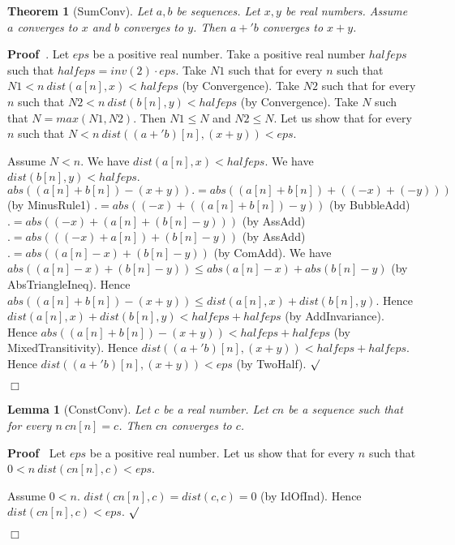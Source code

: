 \documentclass{article}
\newenvironment{forthel}{\begin{leftbar}}{\end{leftbar}}
\newenvironment{proof}{\noindent\textbf{Proof\ }}{\hspace*{\fill}$\Box$\medskip}
\newenvironment{subproof}{\begin{list}{}{}
		\item[\text{Proof}]}{\hfill $\surd$ \end{list}}
\newtheorem{lemma}{Lemma}
\newtheorem{theorem}{Theorem}
\begin{document}
\begin{forthel}
	\begin{theorem} [SumConv]
	Let $a,b$ be sequences. Let $x,y$ be real numbers. Assume $a$ converges to $x$ and $b$ converges to $y$.
	Then $a +' b$ converges to $x + y$.
	\end{theorem}
	\begin{proof}.
	Let $eps$ be a positive real number.
	Take a positive real number $halfeps$ such that $halfeps = inv(2) \cdot eps$.
	Take $N1$ such that for every $n$ such that $N1 < n \ dist(a[n],x) < halfeps$ (by Convergence).
	Take $N2$ such that for every $n$ such that $N2 < n \ dist(b[n],y) < halfeps$ (by Convergence).
	Take $N$ such that $N = max(N1,N2)$.
	Then $N1 \leq N$ and $N2 \leq N$.
	Let us show that for every $n$ such that $N < n \ dist((a +' b)[n],(x+y)) < eps$.
	\begin{subproof}
	Assume $N < n$.
	We have $dist(a[n],x) < halfeps$.
	We have $dist(b[n],y) < halfeps$.
	$abs((a[n] + b[n]) - (x + y)) .= abs((a[n] + b[n]) + ((-x) + (-y)))$ (by MinusRule1)
	$.= abs((-x) + ((a[n] + b[n]) - y))$ (by BubbleAdd)
	$.= abs((-x) + (a[n] + (b[n] - y)))$ (by AssAdd)
	$.= abs(((-x) + a[n]) + (b[n] - y))$ (by AssAdd)
	$.= abs((a[n] - x) + (b[n] - y))$ (by ComAdd).
	We have $abs((a[n] - x) + (b[n] - y)) \leq abs(a[n] - x) + abs(b[n] - y)$  (by AbsTriangleIneq).
	Hence $abs((a[n] + b[n]) - (x + y)) \leq dist(a[n],x) + dist(b[n],y)$.
	Hence $dist(a[n],x) + dist(b[n],y) < halfeps + halfeps$ (by AddInvariance).
	Hence $abs((a[n] + b[n]) - (x + y)) < halfeps + halfeps$ (by MixedTransitivity).
	Hence $dist((a +' b)[n],(x + y)) < halfeps + halfeps$.
	Hence $dist((a +' b)[n],(x + y)) < eps$ (by TwoHalf).
	\end{subproof}
	\end{proof}
	
	\begin{lemma} [ConstConv]
	Let $c$ be a real number. Let $cn$ be a sequence such that for every $n \ cn[n] = c$.
	Then $cn$ converges to $c$.
	\end{lemma}
	\begin{proof}
	Let $eps$ be a positive real number.
	Let us show that for every $n$ such that $0 < n \ dist(cn[n],c) < eps$.
	\begin{subproof}
	Assume $0 < n$.
	$dist(cn[n],c) = dist(c,c) = 0$ (by IdOfInd).
	Hence $dist(cn[n],c) < eps$.
	\end{subproof}
	\end{proof}
	

\end{forthel}
\end{document}
